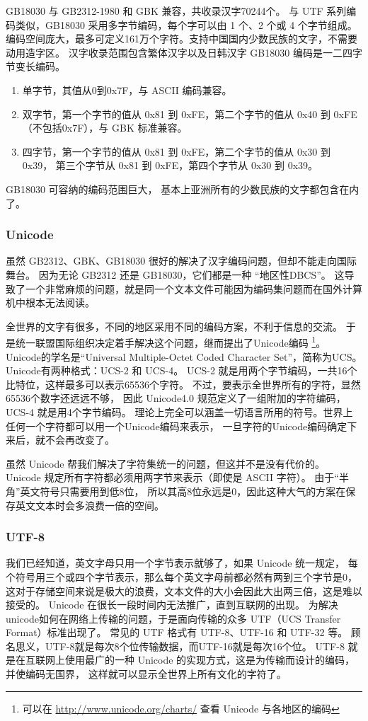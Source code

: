 GB18030 与 GB2312-1980 和 GBK 兼容，共收录汉字70244个。
与 UTF 系列编码类似，GB18030 采用多字节编码，每个字可以由 1 个、2 个或 4 个字节组成。
编码空间庞大，最多可定义161万个字符。支持中国国内少数民族的文字，不需要动用造字区。
汉字收录范围包含繁体汉字以及日韩汉字 GB18030 编码是一二四字节变长编码。
\begin{enumerate}
  \item 单字节，其值从0到0x7F，与 ASCII 编码兼容。

  \item 双字节，第一个字节的值从 0x81 到 0xFE，第二个字节的值从 0x40 到 0xFE（不包括0x7F），与 GBK 标准兼容。

  \item 四字节，第一个字节的值从 0x81 到 0xFE，第二个字节的值从 0x30 到 0x39，
      第三个字节从 0x81 到 0xFE，第四个字节从 0x30 到 0x39。
\end{enumerate}

GB18030 可容纳的编码范围巨大， 基本上亚洲所有的少数民族的文字都包含在内了。

\subsubsection{Unicode}
虽然 GB2312、GBK、GB18030 很好的解决了汉字编码问题，但却不能走向国际舞台。
因为无论 GB2312 还是 GB18030，它们都是一种 “地区性DBCS”。
这导致了一个非常麻烦的问题，就是同一个文本文件可能因为编码集问题而在国外计算机中根本无法阅读。

全世界的文字有很多，不同的地区采用不同的编码方案，不利于信息的交流。
于是统一联盟国际组织决定着手解决这个问题，继而提出了Unicode编码
\footnote{可以在 \url{http://www.unicode.org/charts/} 查看 Unicode 与各地区的编码}。
Unicode的学名是“Universal Multiple-Octet Coded Character Set”，简称为UCS。
Unicode有两种格式：UCS-2 和 UCS-4。
UCS-2 就是用两个字节编码，一共16个比特位，这样最多可以表示65536个字符。
不过，要表示全世界所有的字符，显然65536个数字还远远不够，
因此 Unicode4.0 规范定义了一组附加的字符编码，UCS-4 就是用4个字节编码。
理论上完全可以涵盖一切语言所用的符号。世界上任何一个字符都可以用一个Unicode编码来表示，
一旦字符的Unicode编码确定下来后，就不会再改变了。

虽然 Unicode 帮我们解决了字符集统一的问题，但这并不是没有代价的。
Unicode 规定所有字符都必须用两字节来表示（即使是 ASCII 字符）。
由于“半角”英文符号只需要用到低8位，
所以其高8位永远是0，因此这种大气的方案在保存英文文本时会多浪费一倍的空间。

\subsubsection{UTF-8}
我们已经知道，英文字母只用一个字节表示就够了，如果 Unicode 统一规定，
每个符号用三个或四个字节表示，那么每个英文字母前都必然有两到三个字节是0，
这对于存储空间来说是极大的浪费，文本文件的大小会因此大出两三倍，这是难以接受的。
Unicode 在很长一段时间内无法推广，直到互联网的出现。
为解决unicode如何在网络上传输的问题，于是面向传输的众多 UTF（UCS Transfer Format）标准出现了。
常见的 UTF 格式有 UTF-8、UTF-16 和 UTF-32 等。
顾名思义，UTF-8就是每次8个位传输数据，而UTF-16就是每次16个位。
UTF-8 就是在互联网上使用最广的一种 Unicode 的实现方式，这是为传输而设计的编码，并使编码无国界，
这样就可以显示全世界上所有文化的字符了。

